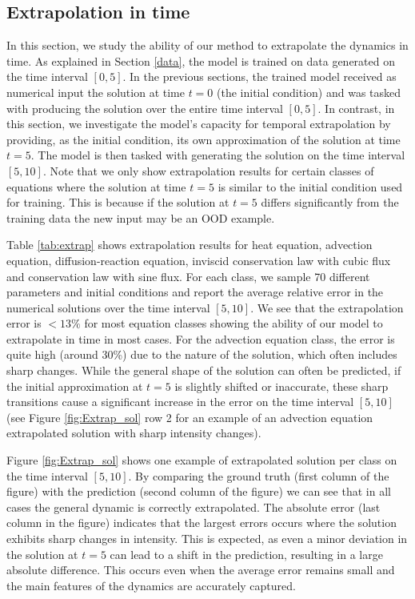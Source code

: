 \documentclass{article}
\begin{document}
\subsection{Extrapolation in time}\label{sec:Extrap}
In this section, we study the ability of our method to extrapolate the dynamics in time. As explained in Section \ref{data}, the model is trained on data generated on the time interval $[0,5]$. In the previous sections, the trained model received as numerical input the solution at time \(t=0\) (the initial condition) and was tasked with producing the solution over the entire time interval \([0,5]\). In contrast, in this section, we investigate the model's capacity for temporal extrapolation by providing, as the initial condition, its own approximation of the solution at time \(t=5\). The model is then tasked with generating the solution on the time interval \([5,10]\).
Note that we only show extrapolation results for certain classes of equations where the solution at time \(t=5\) is similar to the initial condition used for training. This is because if the solution at \(t=5\) differs significantly from the training data the new input may be an OOD example.

Table \ref{tab:extrap} shows extrapolation results for heat equation, advection equation, diffusion-reaction equation,
inviscid conservation law with cubic flux and
conservation law with sine flux. For each class, we sample 70 different parameters and initial conditions and report the average relative error in the numerical solutions over the time interval \([5,10]\). We see that the extrapolation error is $< 13\%$ for most equation classes showing the ability of our model to extrapolate in time in most cases. For the advection equation class, the error is quite high (around 30\%) due to the nature of the solution, which often includes sharp changes. While the general shape of the solution can often be predicted, if the initial approximation at \(t=5\) is slightly shifted or inaccurate, these sharp transitions cause a significant increase in the error on the time interval \([5,10]\) (see Figure \ref{fig:Extrap_sol} row 2 for an example of an advection equation extrapolated solution with sharp intensity changes).

Figure \ref{fig:Extrap_sol} shows one example of extrapolated solution per class on the time interval $[5,10]$. By comparing the ground truth (first column of the figure) with the prediction (second column of the figure) we can see that in all cases the general dynamic is correctly extrapolated. The absolute error (last column in the figure) indicates that the largest errors occurs where the solution exhibits sharp changes in intensity. This is expected, as even a minor deviation in the solution at \(t=5\) can lead to a shift in the prediction, resulting in a large absolute difference. This occurs even when the average error remains small and the main features of the dynamics are accurately captured.
\end{document}
